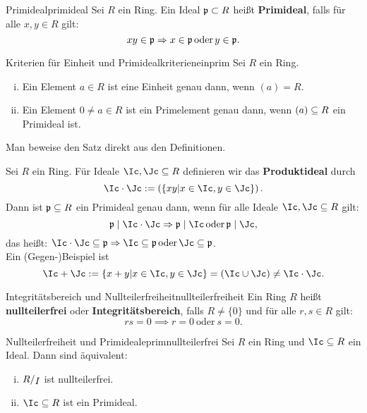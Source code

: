 \begin{definition}{Primideal}{primideal}
Sei $R$ ein Ring. Ein Ideal $\mathfrak{p} \subset R$ heißt \textbf{Primideal}, falls für alle $x,y \in R$ gilt:
\begin{equation}
xy \in \fp \implies x\in \fp \, \text{oder} \, y \in \fp.
\end{equation}
\end{definition}
\begin{satz}{Kriterien für Einheit und Primideal}{kriterieneinprim}
Sei $R$ ein Ring.
\begin{enumerate}[(i)]
\item Ein Element $a \in R$ ist eine Einheit genau dann, wenn $(a) =R$.
\item Ein Element $0 \neq a \in R$ ist ein Primelement genau dann, wenn $(a) \subseteq R$ ein Primideal ist.
\end{enumerate}
\end{satz}
\begin{übung}
Man beweise den Satz direkt aus den Definitionen.
\end{übung}
\begin{übung}
Sei $R$ ein Ring. Für Ideale $\Ic, \Jc \sub R$ definieren wir das \textbf{Produktideal} durch
\begin{equation}
\Ic \cdot \Jc := \left(\{xy| x \in \Ic, y \in \Jc\}\right).
\end{equation}
Dann ist $\mathfrak{p} \subseteq R$ ein Primideal genau dann, wenn für alle Ideale $\Ic, \Jc \sub R$ gilt:
\begin{equation}
\fp \mid \Ic \cdot \Jc \implies \fp \mid \Ic \, \text{oder} \, \fp \mid \Jc,
\end{equation}
das heißt: $\Ic \cdot \Jc \sub \fp  \implies \Ic \sub \fp \, \text{oder} \, \Jc \sub \fp$.\\
Ein (Gegen-)Beispiel ist 
\begin{equation}
\Ic + \Jc := \{x+y| x \in \Ic, y \in \Jc\} = (\Ic \cup \Jc) \neq \Ic \cdot \Jc.
\end{equation}
\end{übung}
\begin{definition}{Integritätsbereich und Nullteilerfreiheit}{nullteilerfreiheit}
Ein Ring $R$ heißt \textbf{nullteilerfrei} oder \textbf{Integritätsbereich}, falls $R\neq \{0\}$ und für alle $r,s \in R$ gilt:
\begin{equation}
rs = 0 \implies r=0 \ \text{oder} \ s=0.
\end{equation}
\end{definition}
\begin{satz}{Nullteilerfreiheit und Primideale}{primnullteilerfrei}
Sei $R$ ein Ring und $\Ic \sub R$ ein Ideal. Dann sind äquivalent:
\begin{enumerate}[(i)]
\item $\quotient{R}{I}$ ist nullteilerfrei.
\item $\Ic \sub R$ ist ein Primideal.
\end{enumerate}
\end{satz}
